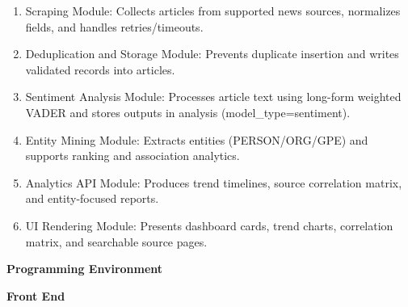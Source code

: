 \begin{enumerate}
\def\labelenumi{\arabic{enumi}.}
\item
  Scraping Module: Collects articles from supported news sources, normalizes fields, and handles retries/timeouts.
\item
  Deduplication and Storage Module: Prevents duplicate insertion and writes validated records into articles.
\item
  Sentiment Analysis Module: Processes article text using long-form weighted VADER and stores outputs in analysis (model\_type=sentiment).
\item
  Entity Mining Module: Extracts entities (PERSON/ORG/GPE) and supports ranking and association analytics.
\item
  Analytics API Module: Produces trend timelines, source correlation matrix, and entity-focused reports.
\item
  UI Rendering Module: Presents dashboard cards, trend charts, correlation matrix, and searchable source pages.
\end{enumerate}

\textbf{Programming Environment}

\textbf{Front End}

